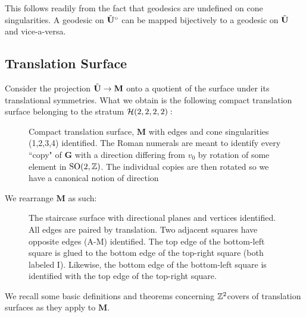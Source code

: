 \documentclass[]{article}
\def\bG{\mathbf{G}} \def\bGs{\mathbf{G}^\circ}
\def\bM{\mathbf{M}}
\def\btUs{\btU^\circ}
\def\SO{\mathrm{SO}}
\begin{document}
This follows readily from the fact that geodesics are undefined on cone singularities. A geodesic on $\btUs$ can be mapped bijectively to a geodesic on  $\tilde{\mathbf{U}}$ and vice-a-versa.



\subsection{Translation Surface}
Consider the projection $\tilde{\mathbf{U}}\rightarrow\mathbf{M}$ onto a quotient of the surface under its translational symmetries. What we obtain is the following compact translation surface belonging to the stratum $\mathcal{H}(2,2,2,2):$

\begin{figure}[H]
\centering

\caption{Compact translation surface, $\mathbf{M}$ with edges and cone singularities (1,2,3,4) identified. The Roman numerals are meant to identify every ``copy" of $\bG$ with a direction differing from $v_0$ by rotation of some element in $\SO(2,\ZZ)$. The individual copies are then rotated so we have a canonical notion of direction }
\label{fig:mtilda}
\end{figure}

We rearrange $\bM$ as such:

\begin{figure}[H]
\centering

\caption{The staircase surface with directional planes and vertices identified. All edges are paired by translation. Two adjacent squares have opposite edges (A-M) identified. The top edge of the bottom-left square is glued to the bottom edge of the top-right square (both labeled I). Likewise, the bottom edge of the bottom-left square is identified with the top edge of the top-right square.}
\label{fig:staircase}
\end{figure}

\noindent We recall some basic definitions and theorems concerning $\mathbb{Z}^2$covers of translation surfaces as they apply to $\bM$. 
\end{document}
